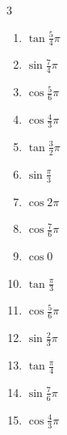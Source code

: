 \begin{multicols}{3}
\begin{enumerate}
  \item $\displaystyle \tan{\frac{5}{4}\pi}$
        \phantom{$\displaystyle =1$}

  \item $\displaystyle \sin{\frac{7}{4}\pi}$

  \item $\displaystyle \cos{\frac{5}{6}\pi}$

  \item $\displaystyle \cos{\frac{4}{3}\pi}$

  \item $\displaystyle \tan{\frac{3}{2}\pi}$
        \phantom{$\displaystyle \quad なし$}

  \item $\displaystyle \sin{\frac{\pi}{3}}$

  \item $\displaystyle \cos{2\pi}$
        \phantom{$\displaystyle =1$}

  \item $\displaystyle \cos{\frac{7}{6}\pi}$

  \item $\displaystyle \cos{0}$
        \phantom{$\displaystyle =1$}

  \item $\displaystyle \tan{\frac{\pi}{3}}$

  \item $\displaystyle \cos{\frac{5}{6}\pi}$

  \item $\displaystyle \sin{\frac{2}{3}\pi}$

  \item $\displaystyle \tan{\frac{\pi}{4}}$
        \phantom{$\displaystyle =1$}

  \item $\displaystyle \sin{\frac{7}{6}\pi}$

\columnbreak %

\resetques

  \item $\displaystyle \cos{\frac{4}{3}\pi}$


\end{enumerate}
\end{multicols}
